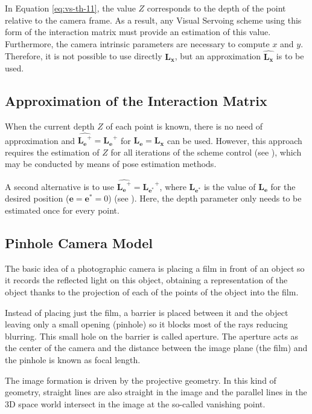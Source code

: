 In Equation \ref{eq:vs-th-11}, the value $Z$ corresponds to the depth of the point relative to the camera frame. As a result, any Visual Servoing scheme using this form of the interaction matrix must provide an estimation of this value. Furthermore, the camera intrinsic parameters are necessary to compute $x$ and $y$. Therefore, it is not possible to use directly $\bm{L_x}$, but an approximation $\widehat{\bm{L_x}}$ is to be used.

\subsection*{Approximation of the Interaction Matrix}

When the current depth $Z$ of each point is known, there is no need of approximation and $\widehat{\bm{L_e}^+} = \bm{L_e}^+$ for $\bm{L_e} = \bm{L_x}$ can be used. However, this approach requires the estimation of $Z$ for all iterations of the scheme control (see \cite{hutchinson_1996}), which may be conducted by means of pose estimation methods.

A second alternative is to use $\widehat{\bm{L_e}^+} = \bm{L_{e^\ast}}^+$, where $\bm{L_{e^\ast}}$ is the value of $\bm{L_{e}}$ for the desired position ($\bm{e} = \bm{e}^\ast = 0$) (see \cite{espiau_1992}). Here, the depth parameter only needs to be estimated once for every point.

\subsection{Pinhole Camera Model}

The basic idea of a photographic camera is placing a film in front of an object so it records the reflected light on this object, obtaining a representation of the object thanks to the projection of each of the points of the object into the film.

Instead of placing just the film, a barrier is placed between it and the object leaving only a small opening (pinhole) so it blocks most of the rays reducing blurring. This small hole on the barrier is called aperture. The aperture acts as the center of the camera and the distance between the image plane (the film) and the pinhole is known as focal length.

The image formation is driven by the projective geometry. In this kind of geometry, straight lines are also straight in the image and the parallel lines in the 3D space world intersect in the image at the so-called vanishing point.
  
